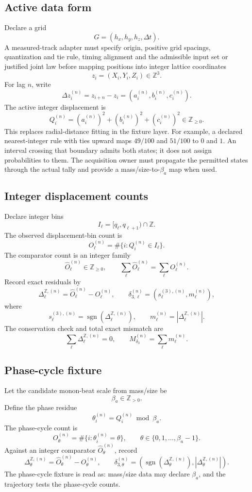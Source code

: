 \subsection{Active data form}
Declare a grid
\[
G=(h_x,h_y,h_z,\Delta t).
\]
A measured-track adapter must specify origin, positive grid spacings,
quantization and tie rule, timing alignment and the admissible input set or
justified joint law before mapping positions into integer lattice coordinates
\[
z_i=(X_i,Y_i,Z_i)\in\mathbb Z^3.
\]
For lag \(n\), write
\[
\Delta z_i^{(n)}=z_{i+n}-z_i=(a_i^{(n)},b_i^{(n)},c_i^{(n)}).
\]
The active integer displacement is
\[
Q_i^{(n)}=(a_i^{(n)})^2+(b_i^{(n)})^2+(c_i^{(n)})^2\in\mathbb Z_{\ge0}.
\]
This replaces radial-distance fitting in the fixture layer.
For example, a declared nearest-integer rule with ties upward maps
\(49/100\) and \(51/100\) to \(0\) and \(1\). An interval crossing that
boundary admits both states; it does not assign probabilities to them.
The acquisition owner must propagate the permitted states through the
actual tally and provide a mass/size-to-\(\beta_a\) map when used.


\subsection{Integer displacement counts}
Declare integer bins
\[
I_\ell=[q_\ell,q_{\ell+1})\cap\mathbb Z.
\]
The observed displacement-bin count is
\[
O_\ell^{(n)}=\#\{i:Q_i^{(n)}\in I_\ell\}.
\]
The comparator count is an integer family
\[
\widehat O_\ell^{(n)}\in\mathbb Z_{\ge0},
\qquad
\sum_\ell\widehat O_\ell^{(n)}=\sum_\ell O_\ell^{(n)}.
\]
Record exact residuals by
\[
\Delta_{\ell}^{\mathbb Z,(n)}=\widehat O_\ell^{(n)}-O_\ell^{(n)},
\qquad
\delta_{3,\ell}^{(n)}=\left(s_\ell^{(3),(n)},m_\ell^{(n)}\right),
\]
where
\[
s_\ell^{(3),(n)}=\operatorname{sgn}(\Delta_\ell^{\mathbb Z,(n)}),
\qquad
m_\ell^{(n)}=|\Delta_\ell^{\mathbb Z,(n)}|.
\]
The conservation check and total exact mismatch are
\[
\sum_\ell\Delta_\ell^{\mathbb Z,(n)}=0,
\qquad
M_{\delta_3}^{(n)}=\sum_\ell m_\ell^{(n)}.
\]

\subsection{Phase-cycle fixture}
Let the candidate monon-beat scale from mass/size be
\[
\beta_a\in\mathbb Z_{>0}.
\]
Define the phase residue
\[
\theta_i^{(n)}=Q_i^{(n)}\bmod\beta_a.
\]
The phase-cycle count is
\[
O_\theta^{(n)}=\#\{i:\theta_i^{(n)}=\theta\},
\qquad
\theta\in\{0,1,\ldots,\beta_a-1\}.
\]
Against an integer comparator \(\widehat O_\theta^{(n)}\), record
\[
\Delta_\theta^{\mathbb Z,(n)}=\widehat O_\theta^{(n)}-O_\theta^{(n)},
\qquad
\delta_{3,\theta}^{(n)}=\left(\operatorname{sgn}(\Delta_\theta^{\mathbb Z,(n)}),|\Delta_\theta^{\mathbb Z,(n)}|\right).
\]
The phase-cycle fixture is read as: mass/size data may declare \(\beta_a\), and the trajectory tests the phase-cycle counts.

